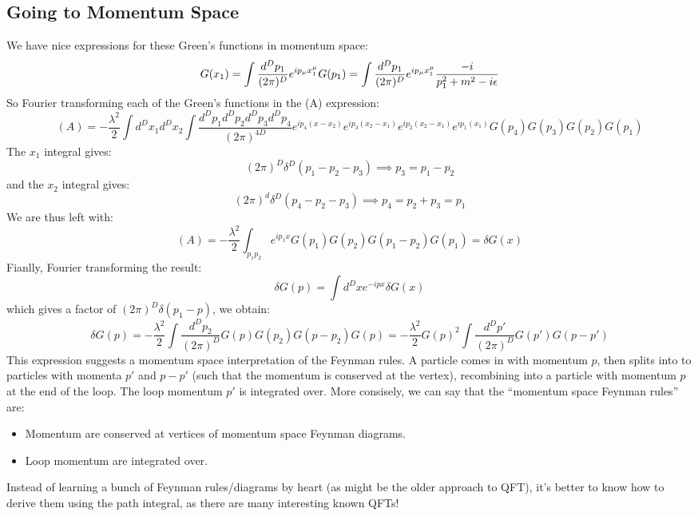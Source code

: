 \subsection{Going to Momentum Space}
We have nice expressions for these Green's functions in momentum space:
\begin{equation}
    G(x_1) = \int \frac{d^Dp_1}{(2\pi)^D}e^{ip_\mu x^\mu_1}G(p_1) = \int \frac{d^Dp_1}{(2\pi)^D}e^{ip_\mu x^\mu_1} \frac{-i}{p_1^2 + m^2 - i\epsilon}
\end{equation}
So Fourier transforming each of the Green's functions in the (A) expression:
\begin{equation}
    (A) = -\frac{\lambda^2}{2}\int d^{D}x_1 d^D x_2\int \frac{d^Dp_1d^Dp_2d^Dp_3d^Dp_4 }{(2\pi)^{4D}} e^{ip_4(x - x_2)}e^{ip_3(x_2- x_1)}e^{ip_2(x_2 - x_1)}e^{ip_1(x_1)}G(p_4)G(p_3)G(p_2)G(p_1)
\end{equation}
The $x_1$ integral gives:
\begin{equation}
    (2\pi)^D \delta^D(p_1 - p_2 - p_3) \implies p_3 = p_1 - p_2
\end{equation}
and the $x_2$ integral gives:
\begin{equation}
    (2\pi)^d \delta^D(p_4 - p_2 - p_3) \implies p_4 = p_2 + p_3 = p_1
\end{equation}
We are thus left with:
\begin{equation}
    (A) = -\frac{\lambda^2}{2}\int_{p_1p_2}e^{ip_1 x}G(p_1)G(p_2)G(p_1 - p_2)G(p_1) = \delta G(x)
\end{equation}
Fianlly, Fourier transforming the result:
\begin{equation}
    \delta G(p) = \int d^Dx e^{-ipx}\delta G(x)
\end{equation}
which gives a factor of $(2\pi)^D \delta(p_1 - p)$, we obtain:
\begin{equation}
    \delta G(p) = -\frac{\lambda^2}{2}\int \frac{d^Dp_2}{(2\pi)^D}G(p)G(p_2)G(p - p_2)G(p) = -\frac{\lambda^2}{2}G(p)^2\int \frac{d^Dp'}{(2\pi)^D}G(p')G(p -p')
\end{equation}
This expression suggests a momentum space interpretation of the Feynman rules. A particle comes in with momentum $p$, then splits into to particles with momenta $p'$ and $p - p'$ (such that the momentum is conserved at the vertex), recombining into a particle with momentum $p$ at the end of the loop. The loop momentum $p'$ is integrated over. More consisely, we can say that the ``momentum space Feynman rules'' are:
\begin{itemize}
    \item Momentum are conserved at vertices of momentum space Feynman diagrams.
    \item Loop momentum are integrated over.
\end{itemize}
Instead of learning a bunch of Feynman rules/diagrams by heart (as might be the older approach to QFT), it's better to know how to derive them using the path integral, as there are many interesting known QFTs!

